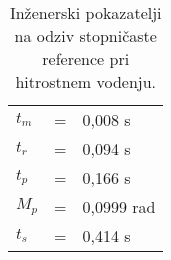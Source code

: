
\begin{table}[!h]
	\centering
	\begin{footnotesize}
		\begin{tabular}{|l c l|}
		\hline
		$ t_m $ & = & 0,008 s\\
		$ t_r $ & = & 0,094 s\\
		$ t_p $ & = & 0,166 s\\
		$ M_p $ & = & 0,0999 rad\\
		$ t_s $ & = & 0,414 s\\
		\hline
		\end{tabular}
	\end{footnotesize}
	\caption{In\v{z}enerski pokazatelji na odziv stopni\v{c}aste reference pri hitrostnem vodenju.}
	\label{table:vel_stepy}
\end{table}